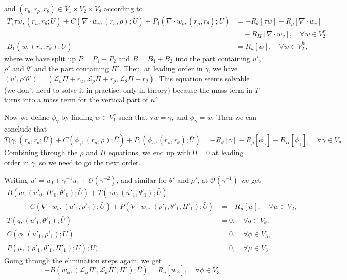 \documentclass{article}
\begin{document}
and $(r_u,r_\rho,r_\theta)\in V_1\times V_2 \times V_\theta$ according to
\begin{align}
  \nonumber
T(\tau w,(r_u,r_\theta; \bar{U})
+C(\nabla \cdot w_v,(r_u,\rho); \bar{U})
+P_1(\nabla\cdot w_v,(r_\rho,r_\theta); \bar{U})
 & = 
- R_\theta[\tau w] - R_\rho[\nabla\cdot w_v] \\
& \quad - R_\Pi[\nabla\cdot w_v], \quad \forall w\in V_2^v, \\ 
  B_1(w, (r_u,r_\theta); \bar{U}) & = R_u[w], \quad \forall w\in
  V_2^h,
\end{align}
where we have split up $P=P_1+P_2$ and $B=B_1+B_2$ into the part
containing $u'$, $\rho'$ and $\theta'$ and the part containing $\Pi'$.
Then, at leading order in $\gamma$, we have $(u',\rho'\theta')=
(\mathcal{L}_u\Pi+r_u,\mathcal{L}_\rho\Pi+r_\rho,\mathcal{L}_\theta\Pi+r_\theta)$.
This equation seems solvable (we don't need to solve it in practise, only in
theory) because the mass term in $T$ turns into a mass term for the
vertical part of $u'$.

Now we define $\phi_\gamma$ by finding $w\in V_1^v$ such that
$\tau w=\gamma$, and $\phi_\gamma = w$. Then we can conclude that
\begin{equation}
T(\gamma,(r_u,r_\theta; \bar{U})
+C(\phi_\gamma,(r_u,\rho); \bar{U})
+P_1(\phi_\gamma,(r_\rho,r_\theta); \bar{U})
  = 
- R_\theta[\gamma] - R_\rho[\phi_\gamma]
- R_\Pi[\phi_\gamma], \quad \forall \gamma\in V_\theta.
\end{equation}
Combining through the $\rho$ and $\Pi$ equations, we end up with
$0=0$ at leading order in $\gamma$, so we need to go the next order.

Writing $u'=u_0 + \gamma^{-1}u_1 + \mathcal{O}(\gamma^{-2})$, and
similar for $\theta'$ and $\rho'$, at $\mathcal{O}(\gamma^{-1})$ we
get
\begin{align}
  \nonumber
  B(w,(u'_0,\Pi'_0,\theta'_0); \bar{U})
  +T(\tau w,(u'_1,\theta'_1); \bar{U}) & \\
  \nonumber
  \qquad + C(\nabla \cdot w_v,(u'_1,\rho'_1); \bar{U})
  + P(\nabla\cdot w_v,(\rho'_1,\theta'_1,\Pi'_1); \bar{U})
  & = -R_u[w], \quad \forall w\in V_2, \\
  T(q,(u'_1,\theta'_1); \bar{U}) & = 0, \quad \forall q\in V_\theta, \\
  C(\phi,(u'_1,\rho'_1); \bar{U}) & = 0, \quad \forall \phi \in V_3, \\
  P(\mu,(\rho'_1,\theta'_1,\Pi'_1); \bar{U}); \bar{U}) & = 0, \quad
  \forall \mu \in V_3.
\end{align}
Going through the elimination steps again, we get
\begin{equation}
  -B(w_\phi, (\mathcal{L}_u\Pi',\mathcal{L}_\theta\Pi',\Pi'); \bar{U})
  = R_u[w_\phi],
  \quad \forall \phi \in V_3.
\end{equation}
\end{document}
